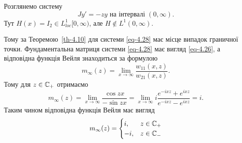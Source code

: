 \begin{example}
	Розглянемо систему
	\begin{equation}\label{eq-4.28}
		Jy'=-zy \text{ на інтервалі } (0,\infty).
	\end{equation}
	Тут $H(x)=I_2\in L^1_{loc}[0,\infty)$, але $H\notin L^1(0,\infty)$.

	Тому за Теоремою~\ref{th-4.10} для системи \eqref{eq-4.28} має місце випадок граничної точки. Фундаментальна матриця системи \eqref{eq-4.28} має вигляд \eqref{eq-4.26}, а відповідна функція Вейля знаходиться за формулою
	\begin{equation*}
		m_\infty(z) = \lim_{x\to\infty} \frac{w_{11}(x,z)}{w_{21}(x,z)}.
	\end{equation*}
	Тому для $z\in\mathbb{C}_+$ отримаємо
	\begin{equation*}
		m_\infty(z) = \lim_{x\to\infty} \frac{\cos{zx}}{-\sin{zx}} = \lim_{x\to\infty} i\frac{e^{-ixz}+e^{ixz}}{e^{-ixz}-e^{ixz}} = i.
	\end{equation*}
	Таким чином відповідна функція Вейля має вигляд
	\begin{equation*}
		m_\infty(z) = 
		\begin{cases}
			i, & z\in\mathbb{C}_+\\
			-i, & z\in\mathbb{C}_-
		\end{cases}
	\end{equation*}
\end{example}

